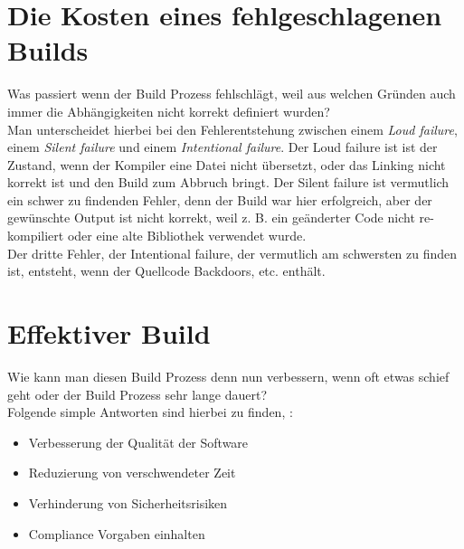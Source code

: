 \section{Die Kosten eines fehlgeschlagenen Builds}
Was passiert wenn der Build Prozess fehlschlägt, weil aus welchen Gründen auch immer die Abhängigkeiten nicht korrekt definiert wurden?
\\
Man unterscheidet hierbei bei den Fehlerentstehung zwischen einem \textit{Loud failure}, einem \textit{Silent failure} und einem \textit{Intentional failure}.
Der Loud failure ist ist der Zustand, wenn der Kompiler eine Datei nicht übersetzt, oder das Linking nicht korrekt ist und den Build zum Abbruch bringt.
Der Silent failure ist vermutlich ein schwer zu findenden Fehler, denn der Build war hier erfolgreich, aber der gewünschte Output ist nicht korrekt, weil \acs{z. B.} ein geänderter Code nicht re-kompiliert oder eine alte Bibliothek verwendet wurde.
\\
Der dritte Fehler, der Intentional failure, der vermutlich am  schwersten zu finden ist, entsteht, wenn der Quellcode Backdoors, \acs{etc.} enthält. \cite{software-analysis}

\section{Effektiver Build}
Wie kann man diesen Build Prozess denn nun verbessern, wenn oft etwas schief geht oder der Build Prozess sehr lange dauert?
\\
Folgende simple Antworten sind hierbei zu finden, \cite{software-analysis}:
\begin{itemize}
	\item Verbesserung der Qualität der Software
	\item Reduzierung von verschwendeter Zeit
	\item Verhinderung von Sicherheitsrisiken 
	\item Compliance Vorgaben einhalten 
\end{itemize}
